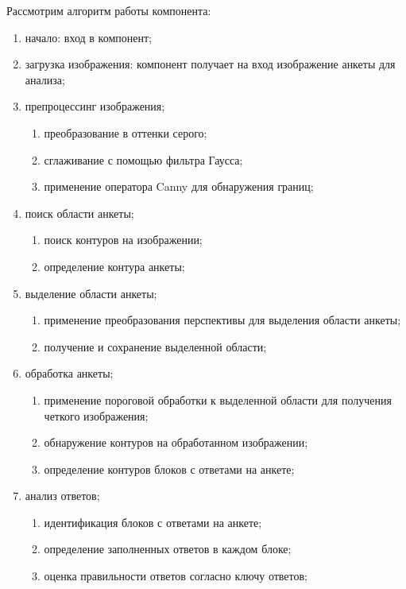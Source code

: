 Рассмотрим алгоритм работы компонента:
\begin{enumerate}
    \item начало: вход в компонент;
    \item ­загрузка изображения: компонент получает на вход изображение анкеты для анализа;
    \item ­препроцессинг изображения;
        \begin{enumerate}
            \item преобразование в оттенки серого;
            \item сглаживание с помощью фильтра Гаусса;
            \item применение оператора Canny для обнаружения границ;
        \end{enumerate}
    \item ­поиск области анкеты;
        \begin{enumerate}
            \item поиск контуров на изображении;
            \item определение контура анкеты;
        \end{enumerate}
    \item выделение области анкеты;
        \begin{enumerate}
            \item применение преобразования перспективы для выделения области анкеты;
            \item получение и сохранение выделенной области;
        \end{enumerate}
    \item обработка анкеты;
        \begin{enumerate}
            \item применение пороговой обработки к выделенной области для получения четкого изображения;
            \item обнаружение контуров на обработанном изображении;
            \item определение контуров блоков с ответами на анкете;
        \end{enumerate}
    \item анализ ответов;
        \begin{enumerate}
            \item идентификация блоков с ответами на анкете;
            \item определение заполненных ответов в каждом блоке;
            \item оценка правильности ответов согласно ключу ответов;

\end{enumerate}
\end{enumerate}
